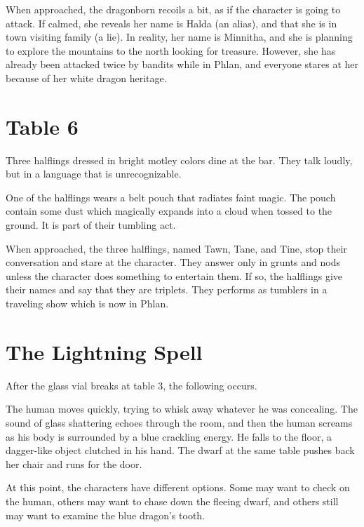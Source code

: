 \documentclass[10pt,a4paper,twoside,bg=print,twocolumn,openany,nodeprecatedcode]{dndbook}
\begin{document}
When approached, the dragonborn recoils a bit, as if the character is going to attack. If calmed, she reveals her name is Halda (an alias), and that she is in town visiting family (a lie). In reality, her name is Minnitha, and she is planning to explore the mountains to the north looking for treasure. However, she has already been attacked twice by bandits while in Phlan, and everyone stares at her because of her white dragon heritage.

\section{Table 6}
\begin{DndReadAloud}{}
Three halflings dressed in bright motley colors dine at the bar. They talk loudly, but in a language that is unrecognizable.

\end{DndReadAloud}

One of the halflings wears a belt pouch that radiates faint magic. The pouch contain some dust which magically expands into a cloud when tossed to the ground. It is part of their tumbling act.

When approached, the three halflings, named Tawn, Tane, and Tine, stop their conversation and stare at the character. They answer only in grunts and nods unless the character does something to entertain them. If so, the halflings give their names and say that they are triplets. They performs as tumblers in a traveling show which is now in Phlan.

\section{The Lightning Spell}
After the glass vial breaks at table 3, the following occurs.

\begin{DndReadAloud}{}
The human moves quickly, trying to whisk away whatever he was concealing. The sound of glass shattering echoes through the room, and then the human screams as his body is surrounded by a blue crackling energy. He falls to the floor, a dagger-like object clutched in his hand. The dwarf at the same table pushes back her chair and runs for the door.

\end{DndReadAloud}

At this point, the characters have different options. Some may want to check on the human, others may want to chase down the fleeing dwarf, and others still may want to examine the blue dragon's tooth.
\end{document}
